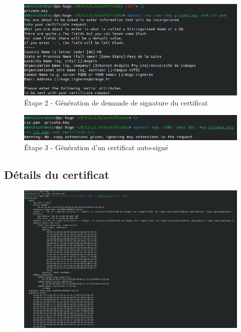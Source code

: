 \documentclass[12pt,a4paper]{article}
\begin{document}
\begin{figure}[!h]
	\begin{center}
		\includegraphics[scale=.85]{clee_privee.png}
		\caption{Étape 2 - Génération de demande de signature du certificat}
	\end{center}
\end{figure}	

\begin{figure}[!h]
	\begin{center}
		\includegraphics[scale=.85]{generation_certificat.png}
		\caption{Étape 3 - Génération d'un certificat auto-signé}
	\end{center}
\end{figure}	


	\subsection{Détails du certificat}

\begin{figure}[!h]
	\begin{center}
		\includegraphics[scale=.5]{certificat_details.png}
		\caption{}
	\end{center}
\end{figure}	
\end{document}

